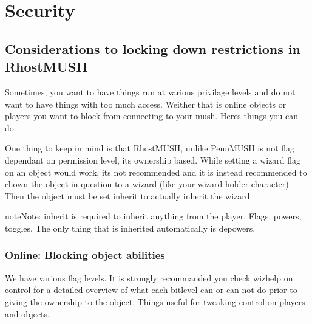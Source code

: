 \documentclass[letterpaper,10pt,english]{sphinxmanual}
\begin{document}
\chapter{Security}
\label{\detokenize{security:security}}\label{\detokenize{security::doc}}

\section{Considerations to locking down restrictions in RhostMUSH}
\label{\detokenize{security:considerations-to-locking-down-restrictions-in-rhostmush}}
\sphinxAtStartPar
Sometimes, you want to have things run at various privilage levels and do not
want to have things with too much access.  Weither that is online objects or
players you want to block from connecting to your mush.  Here\textquotesingle{}s things you can
do.

\sphinxAtStartPar
One thing to keep in mind is that RhostMUSH, unlike PennMUSH is not flag
dependant on permission level, it\textquotesingle{}s ownership based.  While setting a wizard
flag on an object would work, it\textquotesingle{}s not recommended and it is instead recommended
to chown the object in question to a wizard (like your wizard holder character)
Then the object must be set inherit to actually inherit the wizard.

\begin{sphinxadmonition}{note}{Note:}
\sphinxAtStartPar
inherit is required to inherit anything from the player.  Flags, powers,
toggles.  The only thing that is inherited automatically is depowers.
\end{sphinxadmonition}


\subsection{Online: Blocking object abilities}
\label{\detokenize{security:online-blocking-object-abilities}}
\sphinxAtStartPar
We have various flag levels.  It is strongly recommanded you check wizhelp
on \textquotesingle{}control\textquotesingle{} for a detailed overview of what each bitlevel can or can not do
prior to giving the ownership to the object.  Things useful for tweaking control
on players and objects.
\end{document}
